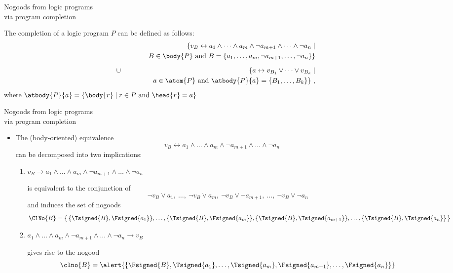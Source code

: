 \begin{frame}[c]{Nogoods from logic programs\\[-1ex]\normalsize via program completion}

The completion of a logic program $P$ can be defined as follows:
%
\begin{eqnarray*}
  &&
  \{
  v_B \leftrightarrow
  a_1          \wedge \dots \wedge a_m      \wedge
  \neg a_{m+1} \wedge \dots \wedge \neg a_n \mid
  \\&&\qquad\quad
  B \in\body{P} \text{ and }
  B = \{a_1,\dots,a_m,\neg a_{m+1},\dots,\neg a_n\}
  \}
  \\[6pt]
  &\cup&
  \{
  a \leftrightarrow
  v_{B_1} \vee \dots \vee v_{B_k}
  \mid
  \\&&\qquad\quad
  a\in\atom{P} \text{ and }
  \atbody{P}{a} = \{B_1,\dots,B_k\}
  \}\ ,
\end{eqnarray*}
%
where $\atbody{P}{a}=\{\body{r}\mid r\in P\text{ and }\head{r}=a\}$
\end{frame}
\begin{frame}{Nogoods from logic programs\\[-1ex]\normalsize via program completion}

  \begin{itemize}
  \item<1-> The (body-oriented) equivalence
    \[
    v_B \leftrightarrow
         a_1     \wedge\dots\wedge      a_m \wedge
    \neg a_{m+1} \wedge\dots\wedge \neg a_n
    \]
    can be decomposed into two implications:
    \medskip
    \begin{enumerate}
    \item<only@2>\normalsize
      \alert{%
      \(
      v_B \to
           a_1     \wedge\dots\wedge      a_m \wedge
      \neg a_{m+1} \wedge\dots\wedge \neg a_n
      \)}

      \smallskip
      is equivalent to the conjunction of
      \[
      \neg v_B \vee  a_1
      ,\ \dots,\
      \neg v_B \vee  a_m
      ,\
      \neg v_B \vee  \neg a_{m+1}
      ,\ \dots,\
      \neg v_B \vee  \neg a_n
      \]
      and induces the set of nogoods
      \alert{\small%
        \[
        \ClNo{B}
        =
        \{\,\{\Tsigned{B},\Fsigned{a_1}\},
        \dots,
        \{\Tsigned{B},\Fsigned{a_m}\},
        \{\Tsigned{B},\Tsigned{a_{m+1}}\},
        \dots,
        \{\Tsigned{B},\Tsigned{a_n}\}\,\}
        \]
      }
    \item<only@3->\normalsize
      \alert{%
      \(
      a_1          \wedge \dots \wedge a_m      \wedge
      \neg a_{m+1} \wedge \dots \wedge \neg a_n
      \rightarrow v_B
      \)}

      \smallskip
      gives rise to the nogood
      \[
      \clno{B}
      =
      \alert{\{\Fsigned{B},\Tsigned{a_1},\dots,\Tsigned{a_m},\Fsigned{a_{m+1}},\dots,\Fsigned{a_n}\}}
      \]
      \bigskip
  \end{enumerate}
\end{itemize}
\end{frame}
